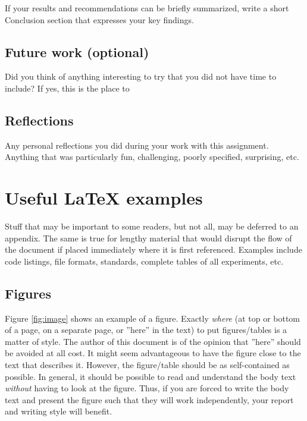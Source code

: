 \documentclass[10pt, titlepage, oneside, a4paper]{article}
\begin{document}
If your results and recommendations can be briefly summarized, write a
short Conclusion section that expresses your key findings.

\subsection{Future work (optional)}
\label{sec:org793101a}

Did you think of anything interesting to try that you did not have
time to include? If yes, this is the place to 

\subsection{Reflections}
\label{sec:orgbcb9428}

Any personal reflections you did during your work with this
assignment. Anything that was particularly fun, challenging, poorly
specified, surprising, etc.

\clearpage\appendix

\section{Useful \LaTeX{} examples}
\label{app:useful-latex-examples}
Stuff that may be important to some readers, but not all, may be
deferred to an appendix. The same is true for lengthy material that
would disrupt the flow of the document if placed immediately where it
is first referenced. Examples include code listings, file formats,
standards, complete tables of all experiments, etc.

\subsection{Figures}
\label{app:figures}
Figure \ref{fig:image} shows an example of a figure. Exactly \emph{where} (at top
or bottom of a page, on a separate page, or ''here'' in the text) to
put figures/tables is a matter of style. The author of this document
is of the opinion that ''here'' should be avoided at all cost. It
might seem advantageous to have the figure close to the text that
describes it. However, the figure/table should be as self-contained as
possible. In general, it should be possible to read and understand the
body text \emph{without} having to look at the figure. Thus, if you are
forced to write the body text and present the figure such that they
will work independently, your report and writing style will benefit.
\end{document}
